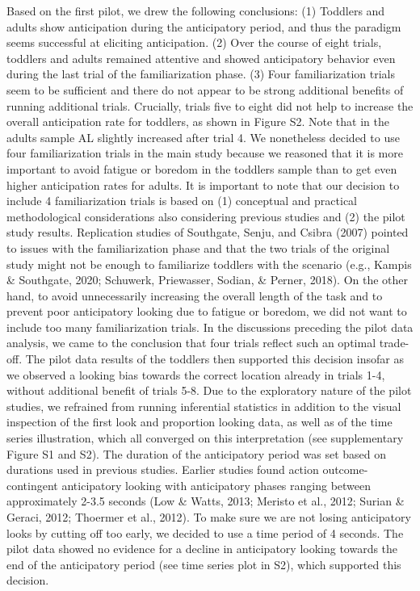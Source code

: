 \documentclass[
  english,
  man, donotrepeattitle,floatsintext]{apa6}
\begin{document}
Based on the first pilot, we drew the following conclusions: (1) Toddlers and adults show anticipation during the anticipatory period, and thus the paradigm seems successful at eliciting anticipation. (2) Over the course of eight trials, toddlers and adults remained attentive and showed anticipatory behavior even during the last trial of the familiarization phase. (3) Four familiarization trials seem to be sufficient and there do not appear to be strong additional benefits of running additional trials. Crucially, trials five to eight did not help to increase the overall anticipation rate for toddlers, as shown in Figure S2. Note that in the adults sample AL slightly increased after trial 4. We nonetheless decided to use four familiarization trials in the main study because we reasoned that it is more important to avoid fatigue or boredom in the toddlers sample than to get even higher anticipation rates for adults.
It is important to note that our decision to include 4 familiarization trials is based on (1) conceptual and practical methodological considerations also considering previous studies and (2) the pilot study results. Replication studies of Southgate, Senju, and Csibra (2007) pointed to issues with the familiarization phase and that the two trials of the original study might not be enough to familiarize toddlers with the scenario (e.g., Kampis \& Southgate, 2020; Schuwerk, Priewasser, Sodian, \& Perner, 2018). On the other hand, to avoid unnecessarily increasing the overall length of the task and to prevent poor anticipatory looking due to fatigue or boredom, we did not want to include too many familiarization trials. In the discussions preceding the pilot data analysis, we came to the conclusion that four trials reflect such an optimal trade-off. The pilot data results of the toddlers then supported this decision insofar as we observed a looking bias towards the correct location already in trials 1-4, without additional benefit of trials 5-8. Due to the exploratory nature of the pilot studies, we refrained from running inferential statistics in addition to the visual inspection of the first look and proportion looking data, as well as of the time series illustration, which all converged on this interpretation (see supplementary Figure S1 and S2).
The duration of the anticipatory period was set based on durations used in previous studies. Earlier studies found action outcome-contingent anticipatory looking with anticipatory phases ranging between approximately 2-3.5 seconds (Low \& Watts, 2013; Meristo et al., 2012; Surian \& Geraci, 2012; Thoermer et al., 2012). To make sure we are not losing anticipatory looks by cutting off too early, we decided to use a time period of 4 seconds. The pilot data showed no evidence for a decline in anticipatory looking towards the end of the anticipatory period (see time series plot in S2), which supported this decision.
\end{document}
